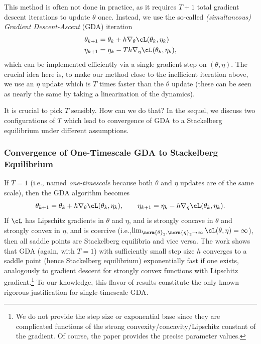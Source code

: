 \documentclass[../../book-main.tex]{subfiles}
\begin{document}
This method is often not done in practice, as it requires \(T + 1\)
total gradient descent iterations to update \(\theta\) once. Instead,
we use the so-called \textit{(simultaneous) Gradient Descent-Ascent}
(GDA) iteration
\begin{align}
    \theta_{k + 1}
    &= \theta_{k} + h\nabla_{\theta}\cL(\theta_{k}, \eta_{k}) \\
    \eta_{k + 1}
    &= \eta_{k} - Th\nabla_{\eta}\cL(\theta_{k}, \eta_{k}),
\end{align}
which can be implemented efficiently via a single gradient step on
\((\theta, \eta)\). The crucial idea here is, to make our method
close to the inefficient iteration above, we use an \(\eta\) update
which is \(T\) times faster than the \(\theta\) update (these can be
seen as nearly the same by taking a linearization of the dynamics).

It is crucial to pick \(T\) sensibly. How can we do that? In the
sequel, we discuss two configurations of \(T\) which lead to
convergence of GDA to a Stackelberg equilibrium under different assumptions.

\subsubsection{Convergence of One-Timescale GDA to Stackelberg Equilibrium}

If \(T = 1\) (i.e., named \textit{one-timescale} because both
\(\theta\) and \(\eta\) updates are of the same scale), then the GDA
algorithm becomes
\begin{equation}
    \theta_{k + 1} = \theta_{k} + h\nabla_{\theta}\cL(\theta_{k},
    \eta_{k}), \qquad \eta_{k + 1} = \eta_{k} -
    h\nabla_{\eta}\cL(\theta_{k}, \eta_{k}).
\end{equation}
If \(\cL\) has Lipschitz gradients in \(\theta\) and \(\eta\), and is
strongly concave in \(\theta\) and strongly convex in \(\eta\), and
is coercive (i.e.,\(\lim_{\norm{\theta}_{2}, \norm{\eta}_{2} \to
\infty}\cL(\theta, \eta) = \infty\)), then all saddle points are
Stackelberg equilibria and vice versa. The work
\cite{zamani2024convergence} shows that GDA (again, with \(T = 1\))
with sufficiently small step size \(h\) converges to a saddle point
(hence Stackelberg equilibrium) exponentially fast if one exists,
analogously to gradient descent for strongly convex functions with
Lipschitz gradient.\footnote{We do not provide the step size or
    exponential base since they are complicated functions of the strong
    convexity/concavity/Lipschitz constant of the gradient. Of course,
    the paper \cite{zamani2024convergence} provides the precise parameter
values.} To our knowledge, this flavor of results constitute the only
known rigorous justification for single-timescale GDA.
\end{document}
